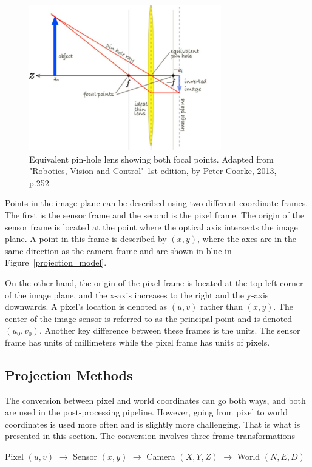 \begin{figure}
	\centering
    \includegraphics[height=2.5in]{figures/projections_two_focal.jpg}
    \caption[Focal points]{Equivalent pin-hole lens showing both focal points. Adapted from "Robotics, Vision and Control" 1st edition, by Peter Coorke, 2013, p.252}
    \label{focal_points}
\end{figure} 

 Points in the image plane can be described using two different coordinate frames.  The first is the sensor frame and the second is the pixel frame.  The origin of the sensor frame is located at the point where the optical axis intersects the image plane.  A point in this frame is described by $(x,y)$, where the axes are in the same direction as the camera frame and are shown in blue in Figure~\ref{projection_model}.  
 
 On the other hand, the origin of the pixel frame is located at the top left corner of the image plane, and the x-axis increases to the right and the y-axis downwards.  A pixel's location is denoted as $(u,v)$ rather than $(x,y)$.  The center of the image sensor is referred to as the principal point and is denoted $(u_0,v_0)$. Another key difference between these frames is the units.  The sensor frame has units of millimeters while the pixel frame has units of pixels.

 \subsection{Projection Methods}

 The conversion between pixel and world coordinates can go both ways, and both are used in the post-processing pipeline.  However, going from pixel to world coordinates is used more often and is slightly more challenging. That is what is presented in this section. The conversion involves three frame transformations   
\begin{center}
 Pixel $(u,v)$ $\rightarrow$ Sensor $(x,y)$ $\rightarrow$ Camera $(X,Y,Z)$ $\rightarrow$ World $(N,E,D)$
\end{center}
 
